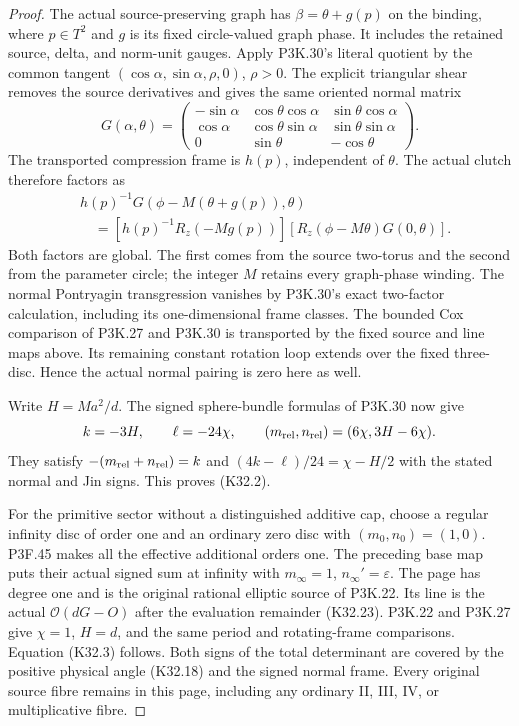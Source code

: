 \begin{proof}
The actual source-preserving graph has
$\beta=\theta+g(p)$ on the binding, where
$p\in T^2$ and $g$ is its fixed circle-valued
graph phase. It includes the retained source,
delta, and norm-unit gauges. Apply P3K.30's
literal quotient by the common tangent
$(\cos\alpha,\sin\alpha,\rho,0)$, $\rho>0$.
The explicit triangular shear removes the
source derivatives and gives the same oriented
normal matrix
\[
 G(\alpha,\theta)=
 \begin{pmatrix}
 -\sin\alpha&\cos\theta\cos\alpha&\sin\theta\cos\alpha\\
 \cos\alpha&\cos\theta\sin\alpha&\sin\theta\sin\alpha\\
 0&\sin\theta&-\cos\theta
 \end{pmatrix}.                                      \tag{K32.27}
\]
The transported compression frame is $h(p)$,
independent of $\theta$. The actual clutch
therefore factors as
\[
 \begin{split}
 &h(p)^{-1}G(\phi-M(\theta+g(p)),\theta)\\
 &\quad=[h(p)^{-1}R_z(-Mg(p))]
           [R_z(\phi-M\theta)G(0,\theta)].             
 \end{split}\tag{K32.28}
\]
Both factors are global. The first comes from
the source two-torus and the second from the
parameter circle; the integer $M$ retains every
graph-phase winding. The normal Pontryagin
transgression vanishes by P3K.30's exact
two-factor calculation, including its
one-dimensional frame classes. The bounded
Cox comparison of P3K.27 and P3K.30 is
transported by the fixed source and line maps
above. Its remaining constant rotation loop
extends over the fixed three-disc. Hence the
actual normal pairing is zero here as well.

Write $H=Ma^2/d$. The signed sphere-bundle
formulas of P3K.30 now give
\[
 k=-3H,\qquad\ell=-24\chi,\qquad
 (m_{\rm rel},n_{\rm rel})=(6\chi,3H-6\chi).
\]
They satisfy $-(m_{\rm rel}+n_{\rm rel})=k$
and $(4k-\ell)/24=\chi-H/2$ with the stated
normal and Jin signs. This proves (K32.2).

For the primitive sector without a distinguished
additive cap, choose a regular infinity disc
of order one and an ordinary zero disc with
$(m_0,n_0)=(1,0)$. P3F.45 makes all the effective
additional orders one. The preceding base
map puts their actual signed sum at infinity
with $m_\infty=1$, $n_\infty'=\varepsilon$.
The page has degree one and is the original
rational elliptic source of P3K.22. Its line
is the actual $\mathcal O(dG-O)$ after the
evaluation remainder (K32.23). P3K.22 and
P3K.27 give $\chi=1$, $H=d$, and the same
period and rotating-frame comparisons.
Equation (K32.3) follows. Both signs of the
total determinant are covered by the positive
physical angle (K32.18) and the signed normal
frame. Every original source fibre remains
in this page, including any ordinary II,
III, IV, or multiplicative fibre.


\end{proof}
